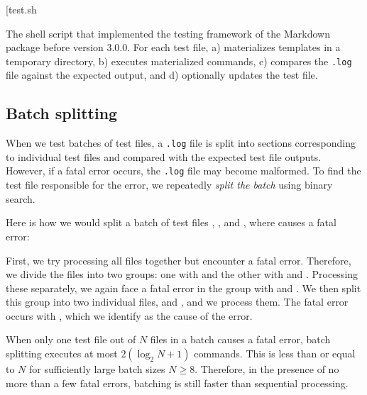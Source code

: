 \documentclass[final]{ltugboat}
\makeatletter
\newenvironment{listing*}{\@dblfloat{listing}}{\end@dblfloat}
\newcounter{listing}
\makeatother
\begin{document}
\begin{listing*}
\bigExample*[{test.sh}
\caption{The shell script  that implemented the testing framework of the Markdown package before version 3.0.0. For each test file,  a) materializes templates in a temporary directory, b) executes materialized commands, c) compares the \texttt{.log} file against the expected output, and d) optionally updates the test file.}
\label{lst:test.sh}
\end{listing*}

\subsection{Batch splitting}

When we test batches of test files, a \texttt{.log} file is split into sections corresponding to individual test files and compared with the expected test file outputs. However, if a fatal error occurs, the \texttt{.log} file may become malformed. To find the test file responsible for the error, we repeatedly \emph{split the batch} using binary search.

Here is how we would split a batch of test files , , and , where  causes a fatal error:

\medskip
\noindent
\begingroup
\centering

\par
\endgroup

\medskip
\noindent
First, we try processing all files together but encounter a fatal error. Therefore, we divide the files into two groups: one with  and the other with  and . Processing these separately, we again face a fatal error in the group with  and . We then split this group into two individual files,  and , and we process them. The fatal error occurs with , which we identify as the cause of the error.

When only one test file out of $N$ files in a batch causes a fatal error, batch splitting executes at most $2 (\log_2 N + 1)$ commands. This is less than or equal to $N$ for sufficiently large batch sizes $N\geq 8$. Therefore, in the presence of no more than a few fatal errors, batching is still faster than sequential processing.

\smallskip
\noindent
\begingroup

\par
\endgroup
\end{document}
